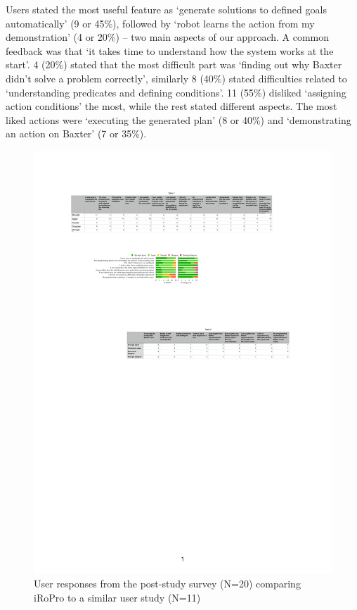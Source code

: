 Users stated the most useful feature as `generate solutions to defined goals automatically' (9 or 45\%), followed by `robot learns the action from my demonstration' (4 or 20\%) -- two main aspects of our approach.
A common feedback was that `it takes time to understand how the system works at the start'.
4 (20\%) stated that the most difficult part was `finding out why Baxter didn't solve a problem correctly', similarly 8 (40\%) stated difficulties related to `understanding predicates and defining conditions'. 
11 (55\%) disliked `assigning action conditions' the most, while the rest stated different aspects.
The most liked actions were `executing the generated plan' (8 or 40\%) and `demonstrating an action on Baxter' (7 or 35\%).

\begin{figure}
	\includegraphics[width=0.98\linewidth]{figures/quan-exp1vsexp2-results.pdf}
	\caption{User responses from the post-study survey (N=20) comparing iRoPro to a similar user study (N=11) \cite{liang2017evaluation}}
	\label{fig:exp1vsexp2-results}
\end{figure}


